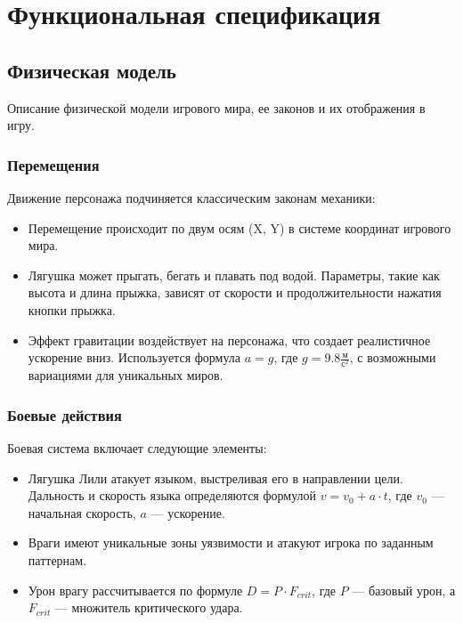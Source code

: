 \documentclass{article}
\begin{document}
\section{Функциональная спецификация}

\subsection{Физическая модель}
Описание физической модели игрового мира, ее законов и их отображения в игру. 

\subsubsection{Перемещения}
Движение персонажа подчиняется классическим законам механики: 
\begin{itemize}
    \item Перемещение происходит по двум осям (X, Y) в системе координат игрового мира.
    \item Лягушка может прыгать, бегать и плавать под водой. Параметры, такие как высота и длина прыжка, зависят от скорости и продолжительности нажатия кнопки прыжка.
    \item Эффект гравитации воздействует на персонажа, что создает реалистичное ускорение вниз. Используется формула $a = g$, где $g = 9.8 \frac{м}{с^2}$, с возможными вариациями для уникальных миров.
\end{itemize}

\subsubsection{Боевые действия}
Боевая система включает следующие элементы:
\begin{itemize}
    \item Лягушка Лили атакует языком, выстреливая его в направлении цели. Дальность и скорость языка определяются формулой $v = v_0 + a \cdot t$, где $v_0$ — начальная скорость, $a$ — ускорение.
    \item Враги имеют уникальные зоны уязвимости и атакуют игрока по заданным паттернам.
    \item Урон врагу рассчитывается по формуле $D = P \cdot F_{crit}$, где $P$ — базовый урон, а $F_{crit}$ — множитель критического удара.
\end{itemize}
\end{document}
